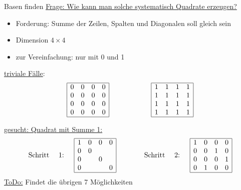 \documentclass{uebungszettel}
\begin{document}
\pagebreak
\begin{aufgabe}{Basen finden}
	\underline{Frage: Wie kann man solche systematisch Quadrate erzeugen?}
	\begin{itemize}
		\item Forderung: Summe der Zeilen, Spalten und Diagonalen soll gleich sein
		\item Dimension $4\times4$
		\item zur Vereinfachung: nur mit 0 und 1 
	\end{itemize}
	
	\underline{triviale F\"alle}:\\
	\[
	\begin{array}{|cccc|}
	\hline
		0 & 0 & 0 & 0 \\ 
		0 & 0 & 0 & 0 \\ 
		0 & 0 & 0 & 0 \\ 
		0 & 0 & 0 & 0 \\
	\hline
	\end{array} 
	\qquad \qquad \qquad
	\begin{array}{|cccc|}
	\hline
		1 & 1 & 1 & 1 \\ 
		1 & 1 & 1 & 1 \\ 
		1 & 1 & 1 & 1 \\ 
		1 & 1 & 1 & 1 \\
	\hline
	\end{array} 
	\]
	
	\underline{gesucht: Quadrat mit Summe 1:}\\
	
	\[
		\mbox{Schritt \quad 1: \quad} 
		\begin{array}{|cccc|}
		\hline
			1 & 0 & 0 & 0 \\ 
			0 & 0 &  &  \\ 
			0 &  & 0 &  \\ 
			0 &  &  & 0 \\
		\hline
		\end{array} 
		\qquad \qquad
		\mbox{Schritt \quad 2: \quad} 
		\begin{array}{|cccc|}
		\hline
		1 & 0 & 0 & 0 \\ 
		0 & 0 & 1 & 0 \\ 
		0 & 0 & 0 & 1 \\ 
		0 & 1 & 0 & 0 \\
		\hline
		\end{array} 
	\]
	 \underline{ToDo:} Findet die \"ubrigen 7 M\"oglichkeiten
	 

\end{aufgabe}
\end{document}
